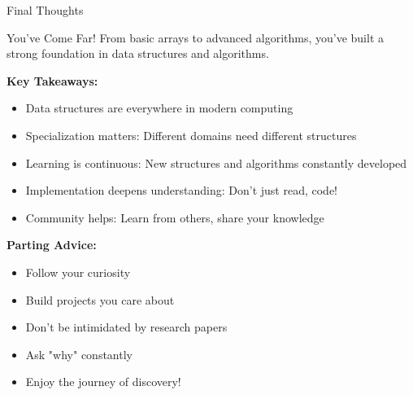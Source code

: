 \documentclass[aspectratio=169,xcolor=dvipsnames]{beamer}
\begin{document}
\begin{frame}{Final Thoughts}
  \begin{block}{You've Come Far!}
    From basic arrays to advanced algorithms, you've built a strong foundation in data structures and algorithms.
  \end{block}

  \vspace{0.3cm}
  \textbf{Key Takeaways:}
  \begin{itemize}
    \item Data structures are everywhere in modern computing
    \item Specialization matters: Different domains need different structures
    \item Learning is continuous: New structures and algorithms constantly developed
    \item Implementation deepens understanding: Don't just read, code!
    \item Community helps: Learn from others, share your knowledge
  \end{itemize}

  \vspace{0.3cm}
  \textbf{Parting Advice:}
  \begin{itemize}
    \item Follow your curiosity
    \item Build projects you care about
    \item Don't be intimidated by research papers
    \item Ask "why" constantly
    \item Enjoy the journey of discovery!
  \end{itemize}
\end{frame}
\end{document}
